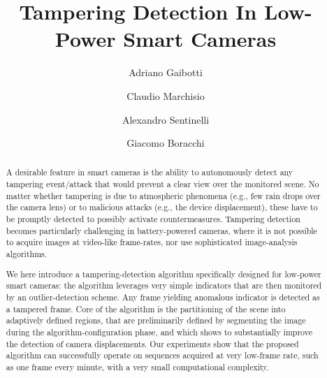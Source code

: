 \documentclass{llncs}
\begin{document}
\title{Tampering Detection In Low-Power Smart Cameras}

\author{Adriano Gaibotti \and Claudio Marchisio \and Alexandro Sentinelli \and Giacomo Boracchi}

\maketitle

\begin{abstract}
A desirable feature in smart cameras is the ability to autonomously detect any tampering event/attack that would prevent a clear view over the monitored scene. No matter whether tampering is due to atmospheric phenomena (e.g., few rain drops over the camera lens) or to malicious attacks (e.g., the device displacement), these have to be promptly detected to possibly activate countermeasures. Tampering detection becomes particularly challenging in battery-powered cameras, where it is not possible to acquire images at video-like frame-rates, nor use sophisticated image-analysis algorithms. 

We here introduce a tampering-detection algorithm specifically designed for low-power smart cameras: the algorithm leverages very simple indicators that are then monitored by an outlier-detection scheme. Any frame yielding anomalous indicator is detected as a tampered frame. Core of the algorithm is the partitioning of the scene into adaptively defined regions, that are preliminarily defined by segmenting the image during the algorithm-configuration phase, and which shows to substantially improve the detection of camera displacements. Our experiments show that the proposed algorithm can successfully operate on sequences acquired at very low-frame rate, such as one frame every minute, with a very small computational complexity. %
\end{abstract}
\end{document}
